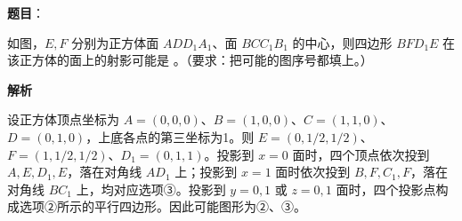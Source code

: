 \begin{answer}

\textbf{题目}：

如图，$E,F$ 分别为正方体面 $ADD_1A_1$、面 $BCC_1B_1$ 的中心，则四边形 $BFD_1E$ 在该正方体的面上的射影可能是 \gkblank{}。（要求：把可能的图序号都填上。）
\nopagebreak[4]
\begin{center}\end{center}
\nopagebreak[4]
\textbf{解析}

设正方体顶点坐标为 $A=(0,0,0)$、$B=(1,0,0)$、$C=(1,1,0)$、$D=(0,1,0)$，上底各点的第三坐标为1。则 $E=(0,1/2,1/2)$、$F=(1,1/2,1/2)$、$D_1=(0,1,1)$。投影到 $x=0$ 面时，四个顶点依次投到 $A,E,D_1,E$，落在对角线 $AD_1$ 上；投影到 $x=1$ 面时依次投到 $B,F,C_1,F$，落在对角线 $BC_1$ 上，均对应选项③。投影到 $y=0,1$ 或 $z=0,1$ 面时，四个投影点构成选项②所示的平行四边形。因此可能图形为②、③。


\end{answer}

